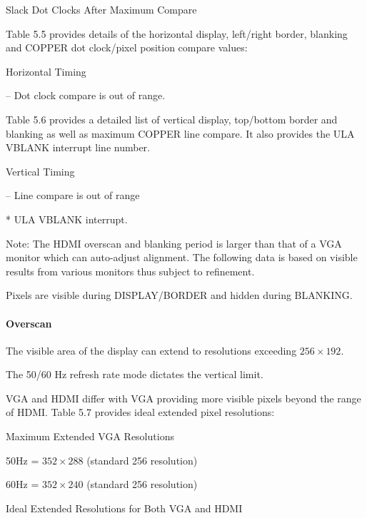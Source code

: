 \begin{table}[h]\centering
  \caption{Slack Dot Clocks After Maximum Compare}
\end{table}

Table 5.5 provides details of the horizontal display, left/right
border, blanking and COPPER dot clock/pixel position compare values:

\begin{table}[h]\centering
  \caption{Horizontal Timing}

  \raggedright -- Dot clock compare is out of range.
\end{table}

Table 5.6 provides a detailed list of vertical display, top/bottom
border and blanking as well as maximum COPPER line compare. It also
provides the ULA VBLANK interrupt line number.

\begin{table}[h]\centering\tiny
  \caption{Vertical Timing}

  \raggedright -- Line compare is out of range

  * ULA VBLANK interrupt.
\end{table}

Note: The HDMI overscan and blanking period is larger than that of a
VGA monitor which can auto-adjust alignment. The following data is
based on visible results from various monitors thus subject to
refinement.

Pixels are visible during DISPLAY/BORDER and hidden during BLANKING.

\paragraph{Overscan}

The visible area of the display can extend to resolutions exceeding
$256\times192$.

The 50/60 Hz refresh rate mode dictates the vertical limit.

VGA and HDMI differ with VGA providing more visible pixels beyond the
range of HDMI. Table 5.7 provides ideal
extended pixel resolutions:

Maximum Extended VGA Resolutions

50Hz = $352\times288$ (standard 256 resolution)

60Hz = $352\times240$ (standard 256 resolution)

\begin{table}[h]\centering
  \caption{Ideal Extended Resolutions for Both VGA and HDMI}
\end{table}

